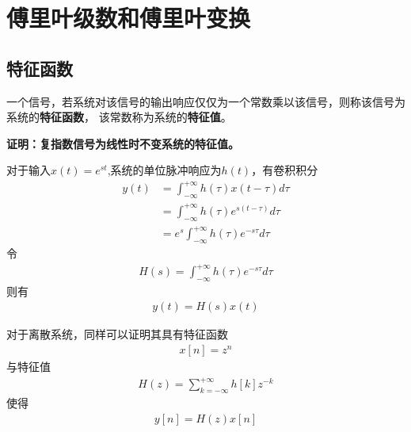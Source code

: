 \section{傅里叶级数和傅里叶变换}

\subsection{特征函数}

一个信号，若系统对该信号的输出响应仅仅为一个常数乘以该信号，则称该信号为系统的\textbf{特征函数}，
该常数称为系统的\textbf{特征值}。

\textbf{证明：复指数信号为线性时不变系统的特征值。}

对于输入$x(t) = e^{st}$,系统的单位脉冲响应为$h(t)$，有卷积积分
\begin{equation}
    \begin{aligned}
        y(t) &= \int_{-\infty}^{+\infty}h(\tau)x(t-\tau)d\tau\\
             &= \int_{-\infty}^{+\infty}h(\tau)e^{s(t-\tau)}d\tau\\
             &= e^{s}\int_{-\infty}^{+\infty}h(\tau)e^{-s\tau}d\tau
    \end{aligned}
    \label{eqa:傅里叶特征函数1}
\end{equation}
令
\begin{equation}
    \begin{aligned}
        H(s) = \int_{-\infty}^{+\infty}h(\tau)e^{-s\tau}d\tau
    \end{aligned}
    \label{eqa:傅里叶特征函数2}
\end{equation}
则有
\begin{equation}
    \begin{aligned}
        y(t) = H(s)x(t)
    \end{aligned}
    \label{eqa:傅里叶特征函数3}
\end{equation}

对于离散系统，同样可以证明其具有特征函数
\begin{equation}
    \begin{aligned}
        x[n] = z^{n}
    \end{aligned}
    \label{eqa:傅里叶特征函数4}
\end{equation}
与特征值
\begin{equation}
    \begin{aligned}
        H(z) = \sum_{k=-\infty}^{+\infty}h[k]z^{-k}
    \end{aligned}
    \label{eqa:傅里叶特征函数5}
\end{equation}
使得
\begin{equation}
    \begin{aligned}
        y[n] = H(z)x[n]
    \end{aligned}
    \label{eqa:傅里叶特征函数6}
\end{equation}

